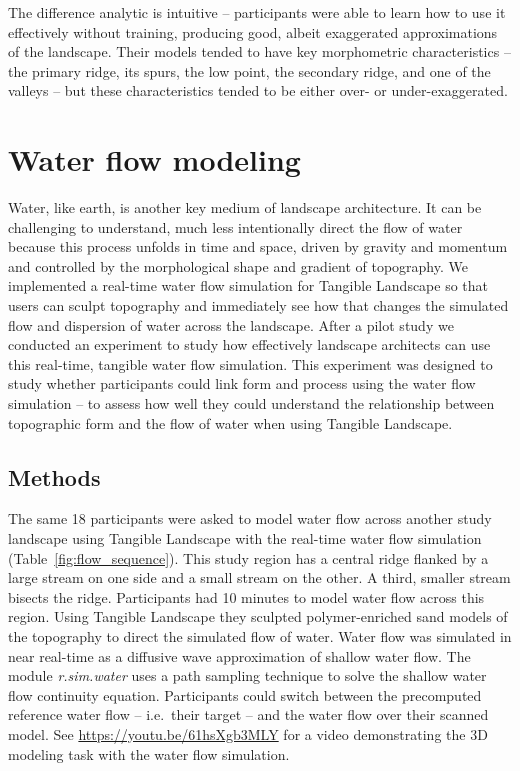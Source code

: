 \documentclass[Afour,sagev,times]{sagej} %
\begin{document}
The difference analytic is intuitive -- 
participants were able to learn how to use it effectively without training, 
producing good, albeit exaggerated approximations of the landscape. 
%
Their models tended to have key morphometric characteristics -- 
the primary ridge, its spurs, the low point, 
the secondary ridge, and one of the valleys -- 
but these characteristics tended to be 
either over- or under-exaggerated.





\section{Water flow modeling}

Water, like earth, is another key medium of landscape architecture.
It can be challenging to understand, much less intentionally direct
the flow of water because this process
unfolds in time and space, 
driven by gravity and momentum and
controlled by the morphological shape and gradient of topography.
We implemented a real-time water flow simulation 
for Tangible Landscape 
so that users can sculpt topography 
and immediately see how that changes 
the simulated flow and dispersion of water
across the landscape.
After a pilot study \cite{Harmon2016}
we conducted an experiment to study 
how effectively landscape architects
can use this real-time, tangible water flow simulation.
This experiment was designed to study whether
participants could link form and process
using the water flow simulation -- to assess
how well they could understand the relationship 
between topographic form 
and the flow of water 
when using Tangible Landscape.

\subsection{Methods}
The same 18 participants were asked to model water flow 
across another study landscape
using Tangible Landscape 
with the real-time water flow simulation 
(Table~\ref{fig:flow_sequence}).
This study region has a central ridge 
flanked by a large stream on one side 
and a small stream on the other.  
A third, smaller stream bisects the ridge.
Participants had 10 minutes to model water flow across this region.
Using Tangible Landscape
they sculpted polymer-enriched sand models of the topography
to direct the simulated flow of water.  
Water flow was simulated in near real-time 
as a diffusive wave approximation of shallow water flow.
The module \textit{r.sim.water} \cite{r.sim.water}
uses a path sampling technique to solve 
the shallow water flow continuity equation. \cite{Mitasova2004}
Participants could switch between 
the precomputed reference water flow -- i.e.~their target -- 
and the water flow over their scanned model.
See \url{https://youtu.be/61hsXgb3MLY}
for a video demonstrating the 3D modeling task 
with the water flow simulation.
\end{document}
